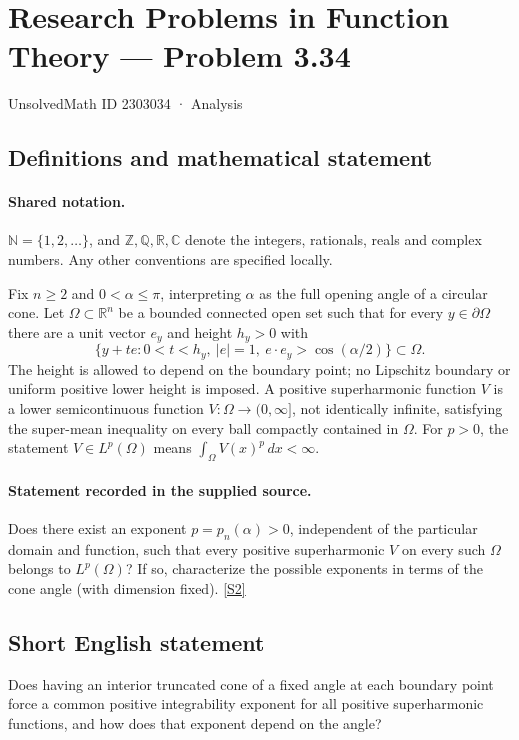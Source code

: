 \documentclass[11pt]{book}
\newcommand{\sref}[2]{\hyperlink{source:#1:#2}{[S#2]}}
\begin{document}
\setcounter{section}{2303033}
\section{Research Problems in Function Theory — Problem 3.34}\label{2303034}
{\small\sffamily UnsolvedMath ID 2303034 · Analysis}
\subsection{Definitions and mathematical statement}

\paragraph{Shared notation.}$\mathbb N=\{1,2,\ldots\}$, and $\mathbb Z,\mathbb Q,\mathbb R,\mathbb C$ denote the integers, rationals, reals and complex numbers. Any other conventions are specified locally.


Fix $n\ge2$ and $0<\alpha\le\pi$, interpreting $\alpha$ as the full opening angle of a circular cone. Let $\Omega\subset\mathbb R^n$ be a bounded connected open set such that for every $y\in\partial\Omega$ there are a unit vector $e_y$ and height $h_y>0$ with
\[\{y+te:0<t<h_y,\ |e|=1,\ e\cdot e_y>\cos(\alpha/2)\}\subset\Omega.
\]
The height is allowed to depend on the boundary point; no Lipschitz boundary or uniform positive lower height is imposed. A positive superharmonic function $V$ is a lower semicontinuous function $V:\Omega\to(0,\infty]$, not identically infinite, satisfying the super-mean inequality on every ball compactly contained in $\Omega$. For $p>0$, the statement $V\in L^p(\Omega)$ means $\int_\Omega V(x)^p\,dx<\infty$.
\paragraph{Statement recorded in the supplied source.}
Does there exist an exponent $p=p_n(\alpha)>0$, independent of the particular domain and function, such that every positive superharmonic $V$ on every such $\Omega$ belongs to $L^p(\Omega)$? If so, characterize the possible exponents in terms of the cone angle (with dimension fixed). \sref{2303034}{2}
\subsection{Short English statement}
Does having an interior truncated cone of a fixed angle at each boundary point force a common positive integrability exponent for all positive superharmonic functions, and how does that exponent depend on the angle?
\end{document}
